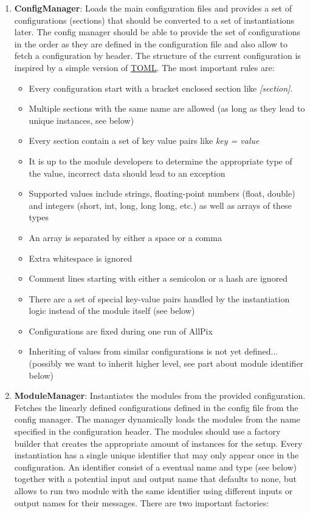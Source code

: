\begin{enumerate}
\item \textbf{ConfigManager}: Loads the main configuration files and provides a set of configurations (sections) that should be converted to a set of instantiations later. The config manager should be able to provide the set of configurations in the order as they are defined in the configuration file and also allow to fetch a configuration by header. The structure of the current configuration is inspired by a simple version of \href{https://github.com/toml-lang/toml}{TOML}. The most important rules are:
\begin{itemize}
\item Every configuration start with a bracket enclosed section like \textit{[section]}.
\item Multiple sections with the same name are allowed (as long as they lead to unique instances, see below)
\item Every section contain a set of key value pairs like \textit{key = value}
\item It is up to the module developers to determine the appropriate type of the value, incorrect data should lead to an exception
\item Supported values include strings, floating-point numbers (float, double) and integers (short, int, long, long long, etc.) as well as arrays of these types
\item An array is separated by either a space or a comma
\item Extra whitespace is ignored
\item Comment lines starting with either a semicolon or a hash are ignored
\item There are a set of special key-value pairs handled by the instantiation logic instead of the module itself (see below)
\item Configurations are fixed during one run of AllPix
\item Inheriting of values from similar configurations is not yet defined... (possibly we want to inherit higher level, see part about module identifier below)
\end{itemize}
\item \textbf{ModuleManager}: Instantiates the modules from the provided configuration. Fetches the linearly defined configurations defined in the config file from the config manager. The manager dynamically loads the modules from the name specified in the configuration header. The modules should use a factory builder that creates the appropriate amount of instances for the setup. Every instantiation has a single unique identifier that may only appear once in the configuration. An identifier consist of a eventual name and type (see below) together with a potential input and output name that defaults to none, but allows to run two module with the same identifier using different inputs or output names for their messages. There are two important factories:

\end{enumerate}
